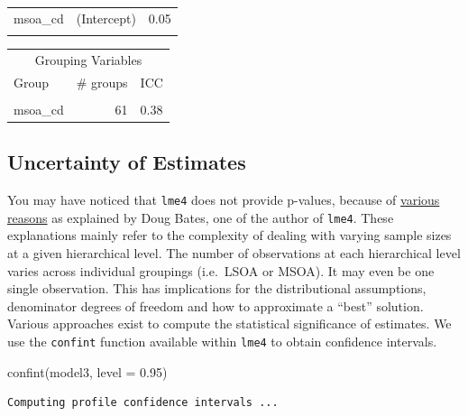 \documentclass[
  letterpaper,
  DIV=11,
  numbers=noendperiod,
  oneside]{scrreprt}
\newenvironment{Shaded}{\begin{snugshade}}{\end{snugshade}}
\newcommand{\AttributeTok}[1]{\textcolor[rgb]{0.40,0.45,0.13}{#1}}
\newcommand{\FloatTok}[1]{\textcolor[rgb]{0.68,0.00,0.00}{#1}}
\newcommand{\FunctionTok}[1]{\textcolor[rgb]{0.28,0.35,0.67}{#1}}
\newcommand{\NormalTok}[1]{\textcolor[rgb]{0.00,0.23,0.31}{#1}}
\begin{document}
\begin{table}[!h]
\begin{tabular}{lll}
msoa\_cd & (Intercept) & 0.05\\
\cellcolor{gray!10}{Residual} & \cellcolor{gray!10}{} & \cellcolor{gray!10}{0.05}\\
\bottomrule
\end{tabular}
\end{table} \begin{table}[!h]
\centering
\begin{tabular}{lrl}
\toprule
\multicolumn{3}{c}{Grouping Variables} \\
\cmidrule(l{3pt}r{3pt}){1-3}
Group & \# groups & ICC\\
\midrule
\cellcolor{gray!10}{lsoa\_cd:msoa\_cd} & \cellcolor{gray!10}{298} & \cellcolor{gray!10}{0.14}\\
msoa\_cd & 61 & 0.38\\
\bottomrule
\end{tabular}
\end{table}

\subsection{Uncertainty of Estimates}\label{uncertainty-of-estimates}

You may have noticed that \texttt{lme4} does not provide p-values,
because of
\href{https://stat.ethz.ch/pipermail/r-help/2006-May/094765.html}{various
reasons} as explained by Doug Bates, one of the author of \texttt{lme4}.
These explanations mainly refer to the complexity of dealing with
varying sample sizes at a given hierarchical level. The number of
observations at each hierarchical level varies across individual
groupings (i.e.~LSOA or MSOA). It may even be one single observation.
This has implications for the distributional assumptions, denominator
degrees of freedom and how to approximate a ``best'' solution. Various
approaches exist to compute the statistical significance of estimates.
We use the \texttt{confint} function available within \texttt{lme4} to
obtain confidence intervals.

\begin{Shaded}
\begin{Highlighting}[]
\FunctionTok{confint}\NormalTok{(model3, }\AttributeTok{level =} \FloatTok{0.95}\NormalTok{)}
\end{Highlighting}
\end{Shaded}

\begin{verbatim}
Computing profile confidence intervals ...
\end{verbatim}
\end{document}
